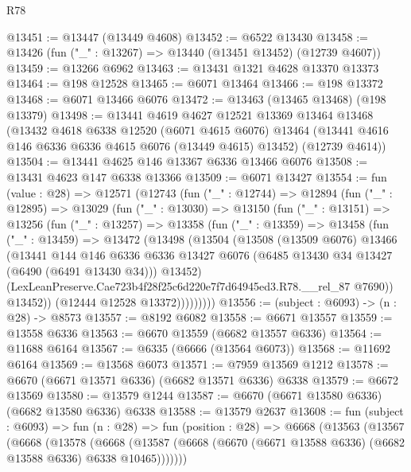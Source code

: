 \begin{lexlean}{R78}
\begin{coremodule}
@13451 := @13447 (@13449 @4608)
@13452 := @6522 @13430
@13458 := @13426 (fun ("_" : @13267) => @13440 (@13451 @13452) (@12739 @4607))
@13459 := @13266 @6962
@13463 := @13431 @1321 @4628 @13370 @13373
@13464 := @198 @12528
@13465 := @6071 @13464
@13466 := @198 @13372
@13468 := @6071 @13466 @6076
@13472 := @13463 (@13465 @13468) (@198 @13379)
@13498 := @13441
    @4619
    @4627
    @12521
    @13369
    @13464
    @13468
    (@13432
      @4618
      @6338
      @12520
      (@6071 @4615 @6076)
      @13464
      (@13441 @4616 @146 @6336 @6336 @4615 @6076 (@13449 @4615) @13452)
      (@12739 @4614))
@13504 := @13441 @4625 @146 @13367 @6336 @13466 @6076
@13508 := @13431 @4623 @147 @6338 @13366
@13509 := @6071 @13427
@13554 := fun (value : @28) =>
  @12571
    (@12743
      (fun ("_" : @12744) =>
      @12894
        (fun ("_" : @12895) =>
        @13029
          (fun ("_" : @13030) =>
          @13150
            (fun ("_" : @13151) =>
            @13256
              (fun ("_" : @13257) =>
              @13358
                (fun ("_" : @13359) =>
                @13458
                  (fun ("_" : @13459) =>
                  @13472
                    (@13498
                      (@13504
                        (@13508
                          (@13509 @6076)
                          @13466
                          (@13441
                            @144
                            @146
                            @6336
                            @6336
                            @13427
                            @6076
                            (@6485 @13430 @34 @13427 (@6490 (@6491 @13430 @34)))
                            @13452)
                          (LexLeanPreserve.Cae723b4f28f25c6d220e7f7d64945ed3.R78.__rel_87 @7690))
                        @13452))
                    (@12444 @12528 @13372)))))))))
@13556 := (subject : @6093) -> (n : @28) -> @8573
@13557 := @8192 @6082
@13558 := @6671 @13557
@13559 := @13558 @6336
@13563 := @6670 @13559 (@6682 @13557 @6336)
@13564 := @11688 @6164
@13567 := @6335 (@6666 (@13564 @6073))
@13568 := @11692 @6164
@13569 := @13568 @6073
@13571 := @7959 @13569 @1212
@13578 := @6670 (@6671 @13571 @6336) (@6682 @13571 @6336) @6338
@13579 := @6672 @13569
@13580 := @13579 @1244
@13587 := @6670 (@6671 @13580 @6336) (@6682 @13580 @6336) @6338
@13588 := @13579 @2637
@13608 := fun (subject : @6093) =>
  fun (n : @28) =>
  fun (position : @28) =>
  @6668
    (@13563
      (@13567
        (@6668
          (@13578
            (@6668
              (@13587 (@6668 (@6670 (@6671 @13588 @6336) (@6682 @13588 @6336) @6338 @10465)))))))

\end{coremodule}
\end{lexlean}

